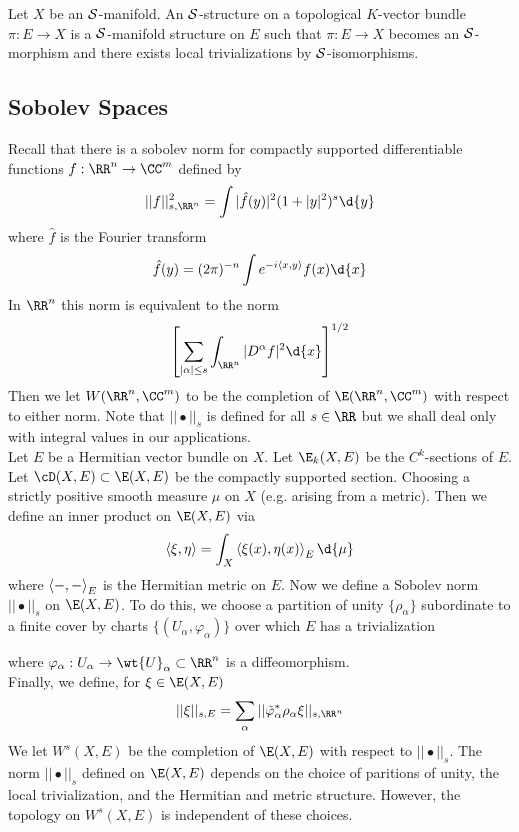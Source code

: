 \documentclass[12pt]{article}
\theoremstyle{plain}
\begin{document}
\begin{defn}
Let $X$ be an $\mathcal{S}$-manifold.
An $\mathcal{S}$-structure on a topological $K$-vector bundle $\pi : E \to X$ is a $\mathcal{S}$-manifold structure on $E$ such that $\pi : E \to X$ becomes an $\mathcal{S}$-morphism and there exists local trivializations by $\mathcal{S}$-isomorphisms. 
\end{defn}

\subsection{Sobolev Spaces}

Recall that there is a sobolev norm for compactly supported differentiable functions $f : \RR^n \to \CC^m$ defined by 
\[ || f ||_{s, \RR^n}^2 = \int | \hat{f}(y) |^2 (1 + |y|^2)^s \d{y} \]
where $\hat{f}$ is the Fourier transform
\[ \hat{f}(y) = (2 \pi)^{-n} \int e^{-i \inner{x}{y}} f(x) \d{x} \]
In $\RR^n$ this norm is equivalent to the norm
\[ \left[ \sum_{|\alpha| \le s} \int_{\RR^n} |D^\alpha f|^2 \d{x} \right]^{1/2} \]
Then we let $W(\RR^n, \CC^m)$ to be the completion of $\E(\RR^n, \CC^m)$ with respect to either norm. Note that $|| \bullet ||_s$ is defined for all $s \in \RR$ but we shall deal only with integral values in our applications.
\bigskip\\
Let $E$ be a Hermitian vector bundle on $X$. Let $\E_k(X, E)$ be the $C^k$-sections of $E$. Let $\cD(X, E) \subset \E(X, E)$ be the compactly supported section. Choosing a strictly positive smooth measure $\mu$ on $X$ (e.g. arising from a metric). Then we define an inner product on $\E(X, E)$ via
\[ \inner{\xi}{\eta} = \int_X \inner{\xi(x)}{\eta(x)}_E \d{\mu} \]
where $\left< -, - \right>_E$ is the Hermitian metric on $E$. Now we define a Sobolev norm $|| \bullet ||_s$ on $\E(X, E)$. To do this, we choose a partition of unity $\{ \rho_\alpha \}$ subordinate to a finite cover by charts $\{ (U_\alpha, \varphi_\alpha) \}$ over which $E$ has a trivialization 
\begin{center}
\end{center}
where $\varphi_\alpha : U_\alpha \to \wt{U}_\alpha \subset \RR^n$ is a diffeomorphism. 
\bigskip\\
Finally, we define, for $\xi \in \E(X, E)$
\[ || \xi ||_{s,E} = \sum_\alpha || \tilde{\varphi}_\alpha^* \rho_\alpha \xi ||_{s, \RR^n} \]
We let $W^s(X, E)$ be the completion of $\E(X, E)$ with respect to $|| \bullet ||_s$. The norm $|| \bullet ||_s$ defined on $\E(X, E)$ depends on the choice of paritions of unity, the local trivialization, and the Hermitian and metric structure. However, the topology on $W^s(X, E)$ is independent of these choices. 
\end{document}
